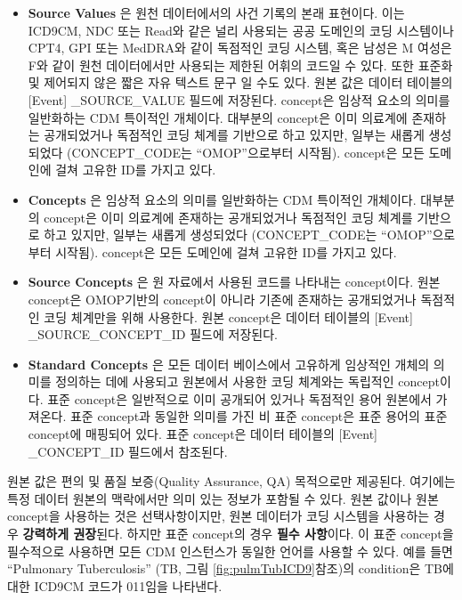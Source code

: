 \documentclass[11pt]{book}
\providecommand{\tightlist}{%
  \setlength{\itemsep}{0pt}\setlength{\parskip}{0pt}}
\theoremstyle{definition}
\theoremstyle{definition}
\theoremstyle{definition}
\theoremstyle{remark}
\begin{document}
\begin{itemize}
\tightlist
\item
  \textbf{Source Values} 은 원천 데이터에서의 사건 기록의 본래 표현이다.
  이는 ICD9CM, NDC 또는 Read와 같은 널리 사용되는 공공 도메인의 코딩
  시스템이나 CPT4, GPI 또는 MedDRA와 같이 독점적인 코딩 시스템, 혹은
  남성은 M 여성은 F와 같이 원천 데이터에서만 사용되는 제한된 어휘의
  코드일 수 있다. 또한 표준화 및 제어되지 않은 짧은 자유 텍스트 문구 일
  수도 있다. 원본 값은 데이터 테이블의 {[}Event{]} \_SOURCE\_VALUE
  필드에 저장된다. concept은 임상적 요소의 의미를 일반화하는 CDM
  특이적인 개체이다. 대부분의 concept은 이미 의료계에 존재하는
  공개되었거나 독점적인 코딩 체계를 기반으로 하고 있지만, 일부는 새롭게
  생성되었다 (CONCEPT\_CODE는 ``OMOP''으로부터 시작됨). concept은 모든
  도메인에 걸쳐 고유한 ID를 가지고 있다.
\item
  \textbf{Concepts} 은 임상적 요소의 의미를 일반화하는 CDM 특이적인
  개체이다. 대부분의 concept은 이미 의료계에 존재하는 공개되었거나
  독점적인 코딩 체계를 기반으로 하고 있지만, 일부는 새롭게 생성되었다
  (CONCEPT\_CODE는 ``OMOP''으로부터 시작됨). concept은 모든 도메인에
  걸쳐 고유한 ID를 가지고 있다.
\item
  \textbf{Source Concepts} 은 원 자료에서 사용된 코드를 나타내는
  concept이다. 원본 concept은 OMOP기반의 concept이 아니라 기존에
  존재하는 공개되었거나 독점적인 코딩 체계만을 위해 사용한다. 원본
  concept은 데이터 테이블의 {[}Event{]} \_SOURCE\_CONCEPT\_ID 필드에
  저장된다.
\item
  \textbf{Standard Concepts} 은 모든 데이터 베이스에서 고유하게 임상적인
  개체의 의미를 정의하는 데에 사용되고 원본에서 사용한 코딩 체계와는
  독립적인 concept이다. 표준 concept은 일반적으로 이미 공개되어 있거나
  독점적인 용어 원본에서 가져온다. 표준 concept과 동일한 의미를 가진 비
  표준 concept은 표준 용어의 표준 concept에 매핑되어 있다. 표준
  concept은 데이터 테이블의 {[}Event{]} \_CONCEPT\_ID 필드에서 참조된다.
\end{itemize}

원본 값은 편의 및 품질 보증(Quality Assurance, QA) 목적으로만 제공된다.
여기에는 특정 데이터 원본의 맥락에서만 의미 있는 정보가 포함될 수 있다.
원본 값이나 원본 concept을 사용하는 것은 선택사항이지만, 원본 데이터가
코딩 시스템을 사용하는 경우 \textbf{강력하게 권장}된다. 하지만 표준
concept의 경우 \textbf{필수 사항}이다. 이 표준 concept을 필수적으로
사용하면 모든 CDM 인스턴스가 동일한 언어를 사용할 수 있다. 예를 들면
``Pulmonary Tuberculosis'' (TB, 그림 \ref{fig:pulmTubICD9}참조)의
condition은 TB에 대한 ICD9CM 코드가 011임을 나타낸다.
\end{document}
